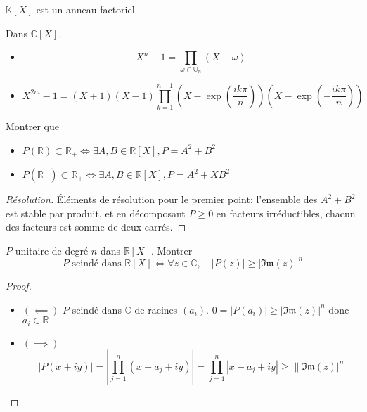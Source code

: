 \begin{thm}
    $\mathbb K[X]$ est un anneau factoriel
\end{thm}

\begin{ex}
    Dans $\mathbb C[X]$, \begin{itemize}
        \item \[
                X^n-1=\prod_{\omega\in\mathbb U_n}(X-\omega)
            \]
        \item \[
                X^{2m}-1=(X+1)(X-1)\prod_{k=1}^{n-1} \left( X-\exp \left( \frac{ik\pi}n \right) \right) \left( X-\exp \left( -\frac{ik\pi}n \right) \right)
            \]
    \end{itemize}
\end{ex}

\begin{exo} Montrer que
    \begin{itemize}
        \item $P(\mathbb R)\subset \mathbb R_+ \iff \exists A, B\in\mathbb R[X], P=A^2+B^2$
        \item $P(\mathbb R_+)\subset \mathbb R_+\iff \exists A, B\in\mathbb R[X], P=A^2+XB^2$
    \end{itemize}
\end{exo}

\begin{proof}[Résolution]
    Éléments de résolution pour le premier point: l'ensemble des $A^2+B^2$ est stable par produit, et en décomposant $P\geq 0$ en facteurs irréductibles, chacun des facteurs est somme de deux carrés.
\end{proof}

\begin{exo}
    $P$ unitaire de degré $n$ dans $\mathbb R[X]$. Montrer \[
        P\text{ scindé dans }\mathbb R[X] \iff \forall z\in\mathbb C, \quad |P(z)|\geq |\mathfrak{Im}(z)|^n
    \]
\end{exo}

\begin{proof}~
    \begin{itemize}
        \item $(\impliedby)$ $P$ scindé dans $\mathbb C$ de racines $(a_i)$. $0=|P(a_i)|\geq |\mathfrak{Im}(z)|^n$ donc $a_i\in\mathbb R$
        \item $(\implies)$ \[
                \left| P(x+iy) \right|= \left| \prod_{j=1}^n(x-a_j+iy) \right|=\prod_{j=1}^n|x-a_j+iy|\geq \|\mathfrak{Im}(z)|^n
            \]
    \end{itemize}
\end{proof}


